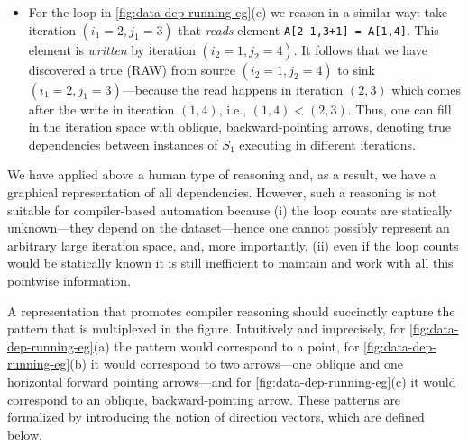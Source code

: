 \documentclass[acmsmall,review]{acmart}\settopmatter{printfolios=true,printccs=false,printacmref=false}
\begin{document}
\begin{itemize}
    \item For the loop in \cref{fig:data-dep-running-eg}(c) we reason in
        a similar way: take iteration $(i_1=2, j_1=3)$ that \emph{reads}
        element {\tt A[2-1,3+1] = A[1,4]}. This element is \emph{written}
        by iteration $(i_2=1,j_2=4)$. It follows that we have discovered
        a true (RAW) from source $(i_2=1,j_2=4)$ to sink 
        $(i_1=2, j_1=3)$---because the read happens in iteration $(2,3)$
        which comes after the write in iteration $(1,4)$,
        i.e., $(1,4) < (2,3)$.  Thus, one can fill in the iteration
        space with oblique, backward-pointing arrows, denoting true dependencies
        between instances of $S_1$ executing in different iterations.
\end{itemize}

We have applied above a human type of reasoning and, as a result, we
have a graphical representation of all dependencies. However, such a reasoning
is not suitable for compiler-based automation because (i) the loop counts
are statically unknown---they depend on the dataset---hence one cannot 
possibly represent an arbitrary large iteration space, and, more importantly,
(ii) even if the loop counts would be statically known it is still inefficient 
to maintain and work with all this pointwise information. 

A representation that promotes compiler reasoning should succinctly capture 
the pattern that is multiplexed in the figure. Intuitively and imprecisely,
for \cref{fig:data-dep-running-eg}(a) the pattern would correspond to a point,
for \cref{fig:data-dep-running-eg}(b) it would correspond to two 
arrows---one oblique and one horizontal forward pointing arrows---and
for \cref{fig:data-dep-running-eg}(c) it would correspond to an
oblique, backward-pointing arrow.
%
These patterns are formalized by introducing the notion of direction vectors,
which are defined below.
\end{document}
